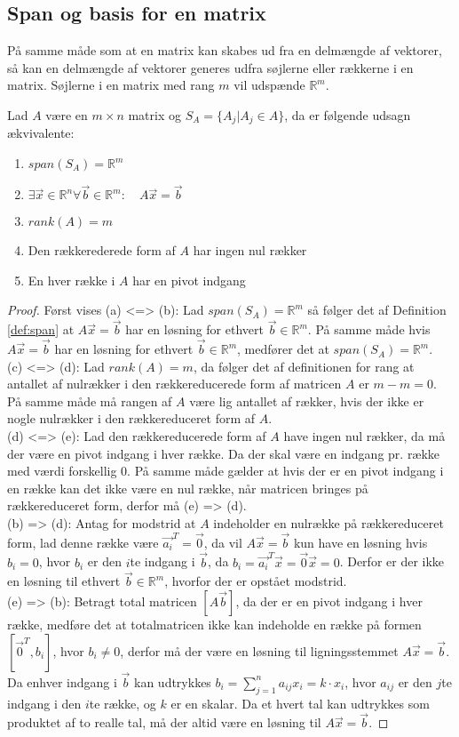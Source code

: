 \subsection{Span og basis for en matrix}
På samme måde som at en matrix kan skabes ud fra en delmængde af vektorer, så kan en delmængde af vektorer generes udfra søjlerne eller rækkerne i en matrix. 
Søjlerne i en matrix med rang $m$ vil udspænde $\mathds{R}^m$.
\begin{stn}
Lad $A$ være en $m\times n$ matrix og $S_A= \{A_j| A_j \in A\}$, da er følgende udsagn ækvivalente:
\begin{enumerate}[label=\alph*]
\item $span(S_A) = \mathds{R}^m$
\item $\exists \vec{x} \in \mathds{R}^n \forall \vec{b} \in \mathds{R}^m: \quad A\vec{x}=\vec{b}$
\item $rank(A) = m$
\item Den rækkerederede form af $A$ har ingen nul rækker
\item En hver række i $A$ har en pivot indgang
\end{enumerate}
\end{stn}
\begin{proof}
Først vises (a) <=> (b):
Lad $span(S_A) = \mathds{R}^m$ så følger det af Definition \ref{def:span} at $A\vec{x}= \vec{b}$ har en løsning for ethvert $\vec{b} \in \mathds{R}^m$.
På samme måde hvis $A\vec{x}= \vec{b}$ har en løsning for ethvert $\vec{b} \in \mathds{R}^m$, medfører det at $span(S_A) = \mathds{R}^m$. 
\\(c) <=> (d): 
Lad $rank(A) = m$, da følger det af definitionen for rang at antallet af nulrækker i den rækkereducerede form af matricen $A$ er $m-m = 0$.
På samme måde må rangen af $A$ være lig antallet af rækker, hvis der ikke er nogle nulrækker i den rækkereduceret form af $A$.
\\(d) <=> (e):
Lad den rækkereducerede form af $A$ have ingen nul rækker, da må der være en pivot indgang i hver række. 
Da der skal være en indgang pr. række med værdi forskellig $0$. 
På samme måde gælder at hvis der er en pivot indgang i en række kan det ikke være en nul række, når matricen bringes på rækkereduceret form, derfor må (e) => (d).
\\(b) => (d):
Antag for modstrid at $A$ indeholder en nulrække på rækkereduceret form, lad denne række være $\vec{a_i}^T = \vec{0}$, da vil $A\vec{x} = \vec{b}$ kun have en løsning hvis $b_i=0$, hvor $b_i$ er den $i$te indgang i $\vec{b}$, da $b_i = \vec{a_i}^T \vec{x} = \vec{0} \vec{x} = 0$. 
Derfor er der ikke en løsning til ethvert $\vec{b} \in \mathds{R}^m$, hvorfor der er opstået modstrid.
\\(e) => (b): 
Betragt total matricen $[A \vec{b}]$, da der er en pivot indgang i hver række, medføre det at totalmatricen ikke kan indeholde en række på formen $[\vec{0}^T, b_i]$, hvor $b_i \neq 0$, derfor må der være en løsning til ligningsstemmet $A\vec{x} = \vec{b}$.
Da enhver indgang i $\vec{b}$ kan udtrykkes $b_i = \sum_{j=1}^n a_{ij} x_i = k \cdot x_i$, hvor $a_{ij}$ er den $j$te indgang i den $i$te række, og $k$ er en skalar.
Da et hvert tal kan udtrykkes som produktet af to realle tal, må der altid være en løsning til $A\vec{x}=\vec{b}$.
\end{proof}

